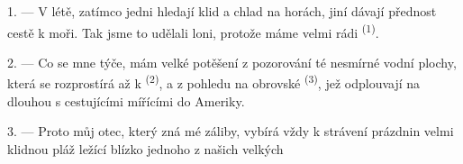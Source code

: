 %
%
%

\VUsaut{4.0mm}
\VUsaut{3.0mm}
\VUsaut{3.0mm}

1. --- V létě, zatímco jedni hledají klid a chlad na horách, jiní dávají přednost cestě k
moři. Tak jsme to udělali loni, protože máme velmi rádi  \textsuperscript{(1)}.

2. --- Co se mne týče, mám velké potěšení z pozorování té nesmírné vodní plochy, která se
rozprostírá až k  \textsuperscript{(2)}, a z pohledu na obrovské
 \textsuperscript{(3)}, jež odplouvají na dlouhou  s
cestujícími mířícími do Ameriky.

3. --- Proto můj otec, který zná mé záliby, vybírá vždy k strávení prázdnin velmi klidnou pláž
ležící blízko jednoho z našich velkých 

